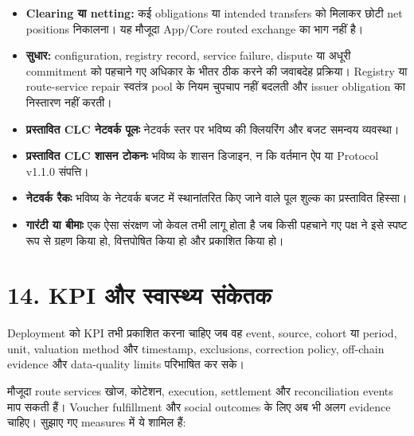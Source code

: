 \documentclass[11pt]{article}
\begin{document}
\begin{itemize}[leftmargin=*]
\item \textbf{Clearing या netting:} कई obligations या intended transfers को मिलाकर छोटी net positions निकालना। यह मौजूदा App/Core routed exchange का भाग नहीं है।
\item \textbf{सुधार:} configuration, registry record, service failure, dispute या अधूरी commitment को पहचाने गए अधिकार के भीतर ठीक करने की जवाबदेह प्रक्रिया। Registry या route-service repair स्वतंत्र pool के नियम चुपचाप नहीं बदलती और issuer obligation का निस्तारण नहीं करती।
\item \textbf{प्रस्तावित CLC नेटवर्क पूलः} नेटवर्क स्तर पर भविष्य की क्लियरिंग और बजट समन्वय व्यवस्था।
\item \textbf{प्रस्तावित CLC शासन टोकनः} भविष्य के शासन डिजाइन, न कि वर्तमान ऐप या Protocol v1.1.0 संपत्ति।
\item \textbf{नेटवर्क रैकः} भविष्य के नेटवर्क बजट में स्थानांतरित किए जाने वाले पूल शुल्क का प्रस्तावित हिस्सा।
\item \textbf{गारंटी या बीमाः} एक ऐसा संरक्षण जो केवल तभी लागू होता है जब किसी पहचाने गए पक्ष ने इसे स्पष्ट रूप से ग्रहण किया हो, वित्तपोषित किया हो और प्रकाशित किया हो।
\end{itemize}

\section*{14. KPI और स्वास्थ्य संकेतक}

Deployment को KPI तभी प्रकाशित करना चाहिए जब वह event, source, cohort या period, unit, valuation method और timestamp, exclusions, correction policy, off-chain evidence और data-quality limits परिभाषित कर सके।

मौजूदा route services खोज, कोटेशन, execution, settlement और reconciliation events माप सकती हैं। Voucher fulfillment और social outcomes के लिए अब भी अलग evidence चाहिए। सुझाए गए measures में ये शामिल हैं:
\end{document}
